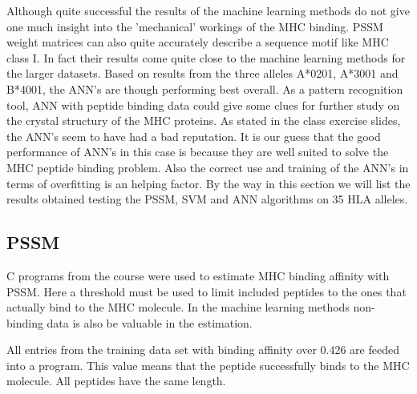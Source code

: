 


Although quite successful the results of the machine learning methods do not give one much insight into the 'mechanical' workings of the MHC binding.
PSSM weight matrices can also quite accurately describe a sequence motif like MHC class I. In fact their results come quite close to the machine learning methods for the larger datasets. 
Based on results from the three alleles A*0201, A*3001 and B*4001, the ANN's are though performing best overall.
As a pattern recognition tool, ANN with peptide binding data could give some clues for further study on the crystal structury of the MHC proteins.
As stated in the class exercise slides, the ANN's seem to have had a bad reputation. 
It is our guess that the good performance of ANN's in this case is because they are well suited to solve the MHC peptide binding problem. 
Also the correct use and training of the ANN's in terms of overfitting is an helping factor.
By the way in this section we will list the results obtained testing the PSSM, SVM and ANN algorithms on 35 HLA alleles.

\subsection*{PSSM}


C programs from the course were used to estimate MHC binding affinity with PSSM. 
Here a threshold must be used to limit included peptides to the ones that actually bind to the MHC molecule. 
In the machine learning methods non-binding data is also be valuable in the estimation.

All entries from the training data set with binding affinity over 0.426 are feeded into a program. 
This value means that the peptide successfully binds to the MHC molecule. All peptides have the same length.

